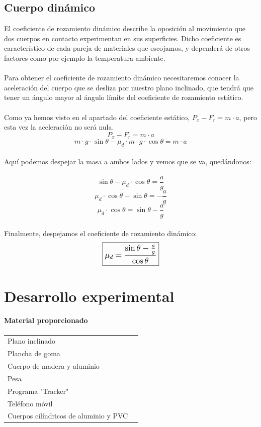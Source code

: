\documentclass{article}
\begin{document}
\subsection{Cuerpo dinámico}
El coeficiente de rozamiento dinámico describe la oposición al movimiento que dos cuerpos en contacto experimentan en sus superficies. Dicho coeficiente es característico de cada pareja de materiales que escojamos, y dependerá de otros factores como por ejemplo la temperatura ambiente. \\ \\
Para obtener el coeficiente de rozamiento dinámico necesitaremos conocer la aceleración del cuerpo que se desliza por nuestro plano inclinado, que tendrá que tener un ángulo mayor al ángulo límite del coeficiente de rozamiento estático. \\\\
Como ya hemos visto en el apartado del coeficiente estático, $P_x - F_r = m \cdot a$, pero esta vez la aceleración no será nula.\\
\[ P_x - F_r = m \cdot a \]
\[ m \cdot g \cdot \sin{\theta} - \mu_d \cdot m \cdot g \cdot \cos{\theta} = m \cdot a\]\\
Aquí podemos despejar la masa a ambos lados y vemos que se va, quedándonos:\\\\
\[ \sin{\theta} - \mu_d \cdot \cos{\theta} = \frac{a}{g}\]
\[ \mu_d \cdot \cos{\theta} - \sin{\theta} = -\frac{a}{g} \]
\[ \mu_d \cdot \cos{\theta} = \sin{\theta} - \frac{a}{g} \]\\
Finalmente, despejamos el coeficiente de rozamiento dinámico:\\
\[ \textbf{\large{\boxed{\mu_d = \frac{\sin{\theta}-\frac{a}{g}}{\cos{\theta}}}}} \]


\clearpage

\section{Desarrollo experimental}

\paragraph{Material proporcionado}\mbox{}
    \begin{tabular}{ll}
        Plano inclinado& \\
        Plancha de goma& \\
        Cuerpo de madera y aluminio& \\
        Pesa& \\
        Programa "Tracker"& \\
        Teléfono móvil& \\
        Cuerpos cilíndricos de aluminio y PVC& \\
    \end{tabular}    
    
\end{document}
